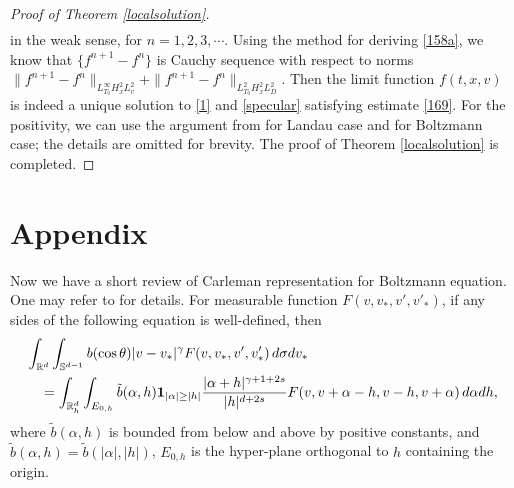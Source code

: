 \documentclass[reqno,a4paper]{amsart}
\numberwithin{equation}{section}
\newcommand{\1}{\mathbf{1}}
\newcommand{\R}{\mathbb{R}}
\renewcommand{\S}{\mathbb{S}}
\newcommand{\<}{\langle}
\renewcommand{\>}{\rangle}
\begin{document}
\begin{proof}[Proof of Theorem \ref{localsolution}]
\begin{multline*}
	\end{multline*}
	in the weak sense, for $n=1,2,3,\cdots$. Using the method for deriving \eqref{158a}, we know that $\{f^{n+1}-f^n\}$ is Cauchy sequence with respect to norms $\|f^{n+1}-f^n\|_{L^\infty_{T_0}H^2_xL^2_v}+\|f^{n+1}-f^n\|_{L^2_{T_0}H^2_{x}L^2_{D}}$. Then the limit function $f(t,x,v)$ is indeed a unique solution to \eqref{1} and \eqref{specular} satisfying estimate \eqref{169}. 
	For the positivity, we can use the argument from \cite[Lemma 8, page 416]{Guo2002a} for Landau case and \cite[Page 833]{Gressman2011} for Boltzmann case; the details are omitted for brevity. The proof of Theorem \ref{localsolution} is completed. 	
	\end{proof}


	
	
	
	
	
	
	
	
	
	 \section{Appendix}\label{Append}
	
	\medskip{}  %
	Now we have a short review of Carleman representation for Boltzmann equation. One may refer to \cite{Alexandre2000,Global2019} for details. 
	For measurable function $F(v,v_*,v',v'_*)$, if any sides of the following equation is well-defined, then
	\begin{align}
		&\int_{\R^d}\int_{\mathbb{S}^{d-1}}b(\cos\theta)|v-v_*|^\gamma F(v,v_*,v',v'_*)\,d\sigma dv_*\notag\\
		&\quad=\int_{\R^d_h}\int_{E_{0,h}}\tilde{b}(\alpha,h)\1_{|\alpha|\ge|h|}\frac{|\alpha+h|^{\gamma+1+2s}}{|h|^{d+2s}}F(v,v+\alpha-h,v-h,v+\alpha)\,d\alpha dh,\label{Carleman}
	\end{align}where $\tilde{b}(\alpha,h)$ is bounded from below and above by positive constants, and $\tilde{b}(\alpha,h)=\tilde{b}(|\alpha|,|h|)$, $E_{0,h}$ is the hyper-plane orthogonal to $h$ containing the origin. 
	
	


	
	
	
	
%	
	
	
	
\end{document}
